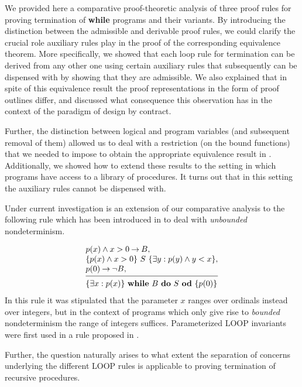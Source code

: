 \documentclass[manuscript, screen, review]{acmart}
\begin{document}
We provided here a comparative proof-theoretic analysis of three proof
rules for proving termination of \textbf{while} programs
and their variants. By introducing the distinction between the
admissible and derivable proof rules, we could clarify the
crucial role auxiliary rules play in the proof of the corresponding
equivalence theorem. More specifically, we showed that each loop rule
for termination can be derived from any other one using certain
auxiliary rules that subsequently can be dispensed with by showing
that they are admissible. We also explained that in spite of this
equivalence result the proof representations in the form of proof
outlines differ, and discussed what consequence this observation has
in the context of the paradigm of design by contract.

Further, the distinction between logical and program variables (and
subsequent removal of them) allowed us to deal
with a restriction (on the bound functions) that we needed to impose
to obtain the appropriate equivalence result in \cite{ABO25}.
Additionally, we showed how to extend these results to the setting in
which programs have access to a library of procedures. It turns
out that in this setting the auxiliary rules cannot be dispensed with.

Under current investigation is an extension of our
comparative  analysis to the following rule 
which has been introduced in 
 \cite{AptP86}  to deal with \emph{unbounded} nondeterminism.

\[
 \begin{array}{l}
   p(x) \wedge x > 0 \ra B,                         \\
 \HT{p(x)\wedge x > 0}{S}{\exists y: p(y)\wedge y< x},          \\
   p(0) \ra \neg B,                         \\ 
  [-\medskipamount]
  \hrulefill                                \\
  \HT{\exists x:p(x)}{\WDD{B}{S}}{p(0)}
 \end{array}
\]
In this rule it was stipulated that the parameter $x$ ranges over
ordinals instead over integers, but in the context of
programs which only give rise to \emph{bounded} nondeterminism  the range of integers suffices.
 Parameterized LOOP invariants were first used in a rule proposed
in \cite{Harel79}.

Further,   the question naturally arises  to what extent
the  separation of concerns underlying the different
LOOP rules is applicable to proving termination of recursive procedures.
\end{document}

